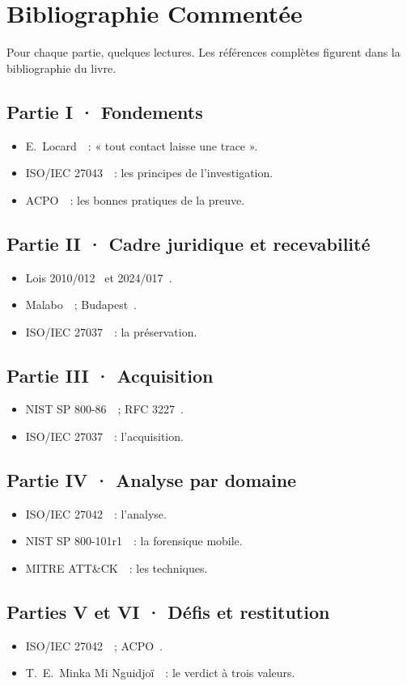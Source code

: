 \chapter{Bibliographie Commentée}
\label{ann:bibliographie}

Pour chaque partie, quelques lectures. Les références complètes figurent dans
la bibliographie du livre.

\section*{Partie I · Fondements}
\begin{itemize}
    \item E.~Locard~\cite{locard1920}~: « tout contact laisse une trace ».
    \item ISO/IEC 27043~\cite{iso27043}~: les principes de l'investigation.
    \item ACPO~\cite{acpo2012}~: les bonnes pratiques de la preuve.
\end{itemize}

\section*{Partie II · Cadre juridique et recevabilité}
\begin{itemize}
    \item Lois 2010/012~\cite{loi2010012} et 2024/017~\cite{loi2024017}.
    \item Malabo~\cite{malabo2014}~; Budapest~\cite{budapest2001}.
    \item ISO/IEC 27037~\cite{iso27037}~: la préservation.
\end{itemize}

\section*{Partie III · Acquisition}
\begin{itemize}
    \item NIST SP 800-86~\cite{nist80086}~; RFC 3227~\cite{rfc3227}.
    \item ISO/IEC 27037~\cite{iso27037}~: l'acquisition.
\end{itemize}

\section*{Partie IV · Analyse par domaine}
\begin{itemize}
    \item ISO/IEC 27042~\cite{iso27042}~: l'analyse.
    \item NIST SP 800-101r1~\cite{nist800101}~: la forensique mobile.
    \item MITRE ATT\&CK~\cite{mitreattack}~: les techniques.
\end{itemize}

\section*{Parties V et VI · Défis et restitution}
\begin{itemize}
    \item ISO/IEC 27042~\cite{iso27042}~; ACPO~\cite{acpo2012}.
    \item T.~E.~Minka Mi Nguidjoï~\cite{minka2026auditologie}~: le verdict à trois valeurs.
\end{itemize}
